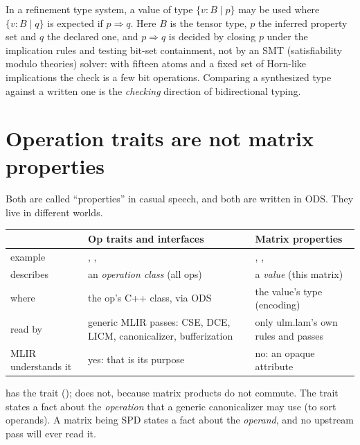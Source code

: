 \begin{theory}
In a refinement type system, a value of type \(\{v{:}B \mid p\}\) may be
used where \(\{v{:}B \mid q\}\) is expected if \(p \Rightarrow q\). Here
\(B\) is the tensor type, \(p\) the inferred property set and \(q\) the
declared one, and \(p \Rightarrow q\) is decided by closing \(p\) under the
implication rules and testing bit-set containment, not by an SMT
(satisfiability modulo theories) solver: with fifteen atoms and a fixed set
of Horn-like implications the check is a few bit operations. Comparing a
synthesized type against a written one is the \emph{checking} direction of
bidirectional typing.
\end{theory}

\section{Operation traits are not matrix properties}
\label{sec:infra-traits}

Both are called ``properties'' in casual speech, and both are written in
ODS. They live in different worlds.

\begin{center}\small
\begin{tabularx}{\linewidth}{@{}P{3.3cm}LL@{}}
\toprule
 & \textbf{Op traits and interfaces} & \textbf{Matrix properties} \\
\midrule
example & , ,  & , ,  \\
describes & an \emph{operation class} (all  ops) & a \emph{value} (this matrix) \\
where & the op's C++ class, via ODS & the value's type (encoding) \\
read by & generic MLIR passes: CSE, DCE, LICM, canonicalizer, bufferization & only ulm.lam's own rules and passes \\
MLIR understands it & yes: that is its purpose & no: an opaque attribute \\
\bottomrule
\end{tabularx}
\end{center}

 has the trait 
();  does
not, because matrix products do not commute. The trait states a fact about
the \emph{operation} that a generic canonicalizer may use (to sort
operands). A matrix being SPD states a fact about the \emph{operand}, and no
upstream pass will ever read it.

